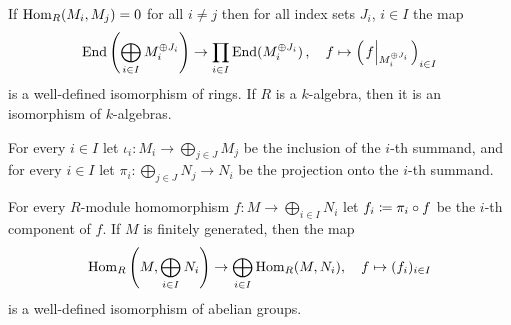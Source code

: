

\begin{corollary}
  \label{corollary: decomposition of endomorphism ring into product including sums}
  If $\operatorname{Hom}_R(M_i, M_j) = 0$ for all $i \neq j$ then for all index sets $J_i$, $i \in I$ the map
  \[
            \End\left( \bigoplus_{i \in I} M_i^{\oplus J_i} \right)
    \to     \prod_{i \in I} \End( M_i^{\oplus J_i} ) \,,
    \quad   f
    \mapsto \left( \restrict*{f}{M_i^{\oplus J_i}} \right)_{i \in I}
  \]
  is a well-defined isomorphism of rings.
  If $R$ is a $k$-algebra, then it is an isomorphism of $k$-algebras.
\end{corollary}




\begin{fluff}
  For every $i \in I$ let $\iota_i \colon M_i \to \bigoplus_{j \in J} M_j$ be the inclusion of the $i$-th summand, and for every $i \in I$ let $\pi_i \colon \bigoplus_{j \in J} N_j \to N_i$ be the projection onto the $i$-th summand.
\end{fluff}


\begin{lemma}
  \label{lemma: hom is additive for fg modules}
  For every $R$-module homomorphism $f \colon M \to \bigoplus_{i \in I} N_i$ let $f_i \coloneqq \pi_i \circ f$ be the $i$-th component of $f$.
  If $M$ is finitely generated, then the map
  \[
            \operatorname{Hom}_R\left( M, \bigoplus_{i \in I} N_i \right)
    \to     \bigoplus_{i \in I} \operatorname{Hom}_R(M, N_i),
    \quad   f
    \mapsto (f_i)_{i \in I}
  \]
  is a well-defined isomorphism of abelian groups.
\end{lemma}




